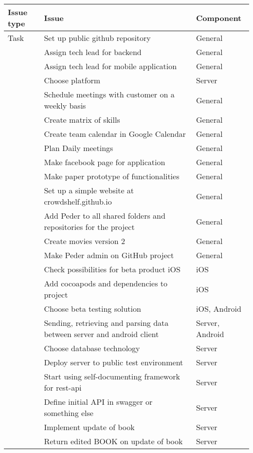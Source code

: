 \begin{longtable}{|L{2cm}|L{10cm}|L{3cm}|}
\hline
\textbf{Issue type} & \textbf{Issue} & \textbf{Component} \\
\hline
Task & Set up public github repository & General \\
\hline
 & Assign tech lead for backend & General \\
\hline
 & Assign tech lead for mobile application & General \\
\hline
 & Choose platform & Server \\
 \hline
 & Schedule meetings with customer on a weekly basis & General \\
 \hline
 & Create matrix of skills & General \\
 \hline
 & Create team calendar in Google Calendar & General \\
 \hline
 & Plan Daily meetings & General \\
 \hline
 & Make facebook page for application & General\\
 \hline
 & Make paper prototype of functionalities & General \\
 \hline
 & Set up a simple website at crowdshelf.github.io & General \\
 \hline
 & Add Peder to all shared folders and repositories for the project &  General\\
 \hline
 & Create movies version 2 & General \\
 \hline
 & Make Peder admin on GitHub project & General \\
 \hline
 & Check possibilities for beta product iOS & iOS \\
 \hline
 & Add cocoapods and dependencies to project & iOS \\
 \hline
 & Choose beta testing solution & iOS, Android \\
 \hline
 & Sending, retrieving and parsing data between server and android client & Server, Android \\
 \hline
 & Choose database technology & Server \\
\hline
 & Deploy server to public test environment & Server \\
 \hline
 & Start using self-documenting framework for rest-api & Server \\
 \hline
 & Define initial API in swagger or something else & Server \\
 \hline
 & Implement update of book & Server \\
 \hline
 & Return edited BOOK on update of book & Server \\

\end{longtable}
